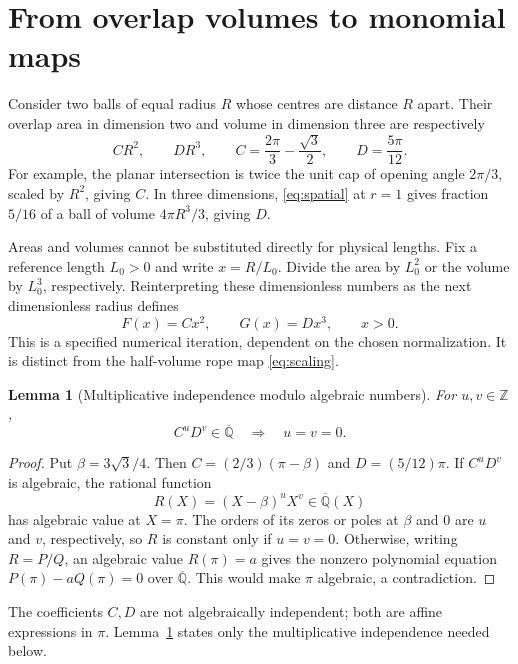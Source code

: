 \documentclass[11pt,a4paper]{article}
\numberwithin{equation}{section}
\newtheorem{lemma}[theorem]{Lemma}
\theoremstyle{definition}
\theoremstyle{remark}
\newcommand{\Qbar}{\overline{\mathbb Q}}
\begin{document}
\section{From overlap volumes to monomial maps}\label{sec:maps}

Consider two balls of equal radius $R$ whose centres are distance $R$ apart. Their overlap area in dimension two and volume in dimension three are respectively
\begin{equation}\label{eq:CD}
 CR^2,\qquad DR^3,\qquad
 C=\frac{2\pi}{3}-\frac{\sqrt3}{2},\qquad D=\frac{5\pi}{12}.
\end{equation}
For example, the planar intersection is twice the unit cap of opening angle $2\pi/3$, scaled by $R^2$, giving $C$. In three dimensions, \eqref{eq:spatial} at $r=1$ gives fraction $5/16$ of a ball of volume $4\pi R^3/3$, giving $D$.

Areas and volumes cannot be substituted directly for physical lengths. Fix a reference length $L_0>0$ and write $x=R/L_0$. Divide the area by $L_0^2$ or the volume by $L_0^3$, respectively. Reinterpreting these dimensionless numbers as the next dimensionless radius defines
\begin{equation}\label{eq:FG}
 F(x)=Cx^2,\qquad G(x)=Dx^3,\qquad x>0.
\end{equation}
This is a specified numerical iteration, dependent on the chosen normalization. It is distinct from the half-volume rope map \eqref{eq:scaling}.

\begin{lemma}[Multiplicative independence modulo algebraic numbers]\label{lem:CD}
For $u,v\in\mathbb Z$,
\begin{equation}\label{eq:CD-independent}
 C^uD^v\in\Qbar\quad\Longrightarrow\quad u=v=0.
\end{equation}
\end{lemma}
\begin{proof}
Put $\beta=3\sqrt3/4$. Then $C=(2/3)(\pi-\beta)$ and $D=(5/12)\pi$. If $C^uD^v$ is algebraic, the rational function
\[
 R(X)=(X-\beta)^uX^v\in\Qbar(X)
\]
has algebraic value at $X=\pi$. The orders of its zeros or poles at $\beta$ and $0$ are $u$ and $v$, respectively, so $R$ is constant only if $u=v=0$. Otherwise, writing $R=P/Q$, an algebraic value $R(\pi)=a$ gives the nonzero polynomial equation $P(\pi)-aQ(\pi)=0$ over $\Qbar$. This would make $\pi$ algebraic, a contradiction.
\end{proof}

The coefficients $C,D$ are not algebraically independent; both are affine expressions in $\pi$. Lemma~\ref{lem:CD} states only the multiplicative independence needed below.
\end{document}

